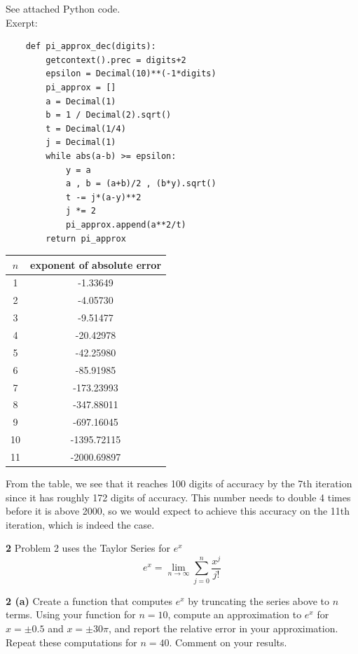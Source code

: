 \documentclass[12pt]{article}
\begin{document}
	See attached Python code. \\
	Exerpt: \\
	
	\begin{lstlisting}
	def pi_approx_dec(digits):
		getcontext().prec = digits+2
		epsilon = Decimal(10)**(-1*digits)
		pi_approx = []
		a = Decimal(1)
		b = 1 / Decimal(2).sqrt()
		t = Decimal(1/4)
		j = Decimal(1)
		while abs(a-b) >= epsilon:
			y = a
			a , b = (a+b)/2 , (b*y).sqrt()
			t -= j*(a-y)**2
			j *= 2
			pi_approx.append(a**2/t)
		return pi_approx
	\end{lstlisting}
	
	\bigbreak
	
	\begin{center}
		\begin{tabular}{|c|c|}
			\hline
			$n$ & exponent of absolute error \\ \hline
			1 & -1.33649 \\ \hline
			2 & -4.05730 \\ \hline
			3 & -9.51477 \\ \hline
			4 & -20.42978 \\ \hline
			5 & -42.25980 \\ \hline
			6 & -85.91985 \\ \hline
			7 & -173.23993 \\ \hline
			8 & -347.88011 \\ \hline
			9 & -697.16045 \\ \hline
			10 & -1395.72115 \\ \hline
			11 & -2000.69897 \\ \hline
		\end{tabular}
	\end{center}
	
	From the table, we see that it reaches 100 digits of accuracy by the 7th iteration since it has roughly 172 digits of accuracy. This number needs to double 4 times before it is above 2000, so we would expect to achieve this accuracy on the 11th iteration, which is indeed the case. \bigbreak
	
\hspace{-7 ex}\textbf{2} Problem 2 uses the Taylor Series for $e^x$ \\
$$ e^x = \lim\limits_{n \to \infty} \sum\limits_{j=0}^{n} \frac{x^j}{j!} $$

\hspace{-7 ex}\textbf{2 (a)} Create a function that computes $e^x$ by truncating the series above to $n$ terms. Using your function for $n = 10$, compute an approximation to $e^x$ for $x = \pm 0.5$ and $x = \pm30\pi$, and report the relative error in your approximation. Repeat these computations for $n = 40$. Comment on your results. \bigbreak
\end{document}
